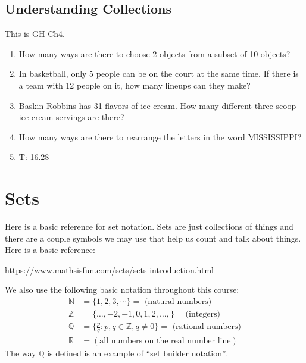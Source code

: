 \documentclass[11pt, letterpaper]{article}
\begin{document}
\subsection{Understanding Collections}
This is GH Ch4. 
\begin{enumerate}
	\item How many ways are there to choose 2 objects from a subset of 10 objects?
	\item In basketball, only 5 people can be on the court at the same time. 
	If there is a team with 12 people on it, how many lineups can they make?
	\item Baskin Robbins has 31 flavors of ice cream. How many different three scoop ice cream servings are there? 
	\item How many ways are there to rearrange the letters in the word MISSISSIPPI? 
	\item T: 16.28
\end{enumerate}
\newpage


\section{Sets}

Here is a basic reference for set notation. 
Sets are just collections of things and there are a couple symbols we may use that help us count and talk about things.
Here is a basic reference: 
\begin{center}
	\url{https://www.mathsisfun.com/sets/sets-introduction.html}
\end{center}
We also use the following basic notation throughout this course:
\begin{align*}
\mathbb{N} &= \lbrace 1, 2, 3, \cdots \rbrace = \mbox{ (natural numbers) }\\
\mathbb{Z} &= \lbrace \ldots, -2,-1,0,1,2,\ldots,\rbrace = \mbox{(integers)}\\
\mathbb{Q} &= \lbrace \frac{p}{q} \colon p,q \in \mathbb{Z}, q\neq 0 \rbrace =\mbox{ (rational numbers)}\\
\mathbb{R} &= (\mbox{all numbers on the real number line})
\end{align*}
The way $\mathbb{Q}$ is defined is an example of ``set builder notation''.
\end{document}
